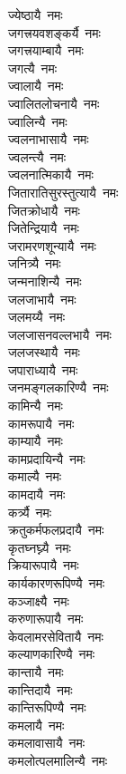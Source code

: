 \begin{flushleft}
\begin{multicols}{2}
ज्येष्ठायै~नमः\\
जगत्त्रयवशङ्कर्यै~नमः\\
जगत्त्रयाम्बायै~नमः\\
जगत्यै~नमः\\
ज्वालायै~नमः\\
ज्वालितलोचनायै~नमः\hfill{}\\
ज्वालिन्यै~नमः\\
ज्वलनाभासायै~नमः\\
ज्वलन्त्यै~नमः\\
ज्वलनात्मिकायै~नमः\\
जितारातिसुरस्तुत्यायै~नमः\\
जितक्रोधायै~नमः\\
जितेन्द्रियायै~नमः\\
जरामरणशून्यायै~नमः\\
जनित्र्यै~नमः\\
जन्मनाशिन्यै~नमः\hfill{}\\
जलजाभायै~नमः\\
जलमय्यै~नमः\\
जलजासनवल्लभायै~नमः\\
जलजस्थायै~नमः\\
जपाराध्यायै~नमः\\
जनमङ्गलकारिण्यै~नमः\\
कामिन्यै~नमः\\
कामरूपायै~नमः\\
काम्यायै~नमः\\
कामप्रदायिन्यै~नमः\hfill{}\\
कमाल्यै~नमः\\
कामदायै~नमः\\
कर्त्र्यै~नमः\\
क्रतुकर्मफलप्रदायै~नमः\\
कृतघ्नघ्न्यै~नमः\\
क्रियारूपायै~नमः\\
कार्यकारणरूपिण्यै~नमः\\
कञ्जाक्ष्यै~नमः\\
करुणारूपायै~नमः\\
केवलामरसेवितायै~नमः\hfill{}\\
कल्याणकारिण्यै~नमः\\
कान्तायै~नमः\\
कान्तिदायै~नमः\\
कान्तिरूपिण्यै~नमः\\
कमलायै~नमः\\
कमलावासायै~नमः\\
कमलोत्पलमालिन्यै~नमः\\

\end{multicols}
\end{flushleft}
